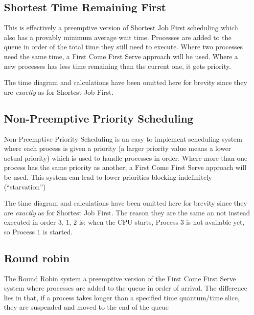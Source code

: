 \subsection{Shortest Time Remaining First}\label{sub:shortest_time_remaining_first}

This is effectively a preemptive version of Shortest Job First scheduling which also has a provably minimum average wait time.
Processes are added to the queue in order of the total time they still need to execute.
Where two processes need the same time, a First Come First Serve approach will be used.
Where a new processes has less time remaining than the current one, it gets priority.

\begin{note}
	The time diagram and calculations have been omitted here for brevity since they are \emph{exactly} as for Shortest Job First.
\end{note}

\subsection{Non-Preemptive Priority Scheduling}\label{sub:non_preemptive_priority_scheduling}

Non-Preemptive Priority Scheduling is an easy to implement scheduling system where each process is given a priority (a larger priority value means a lower actual priority) which is used to handle processes in order.
Where more than one process has the same priority as another, a First Come First Serve approach will be used.
This system can lead to lower priorities blocking indefinitely (``starvation'')

\begin{note}
	The time diagram and calculations have been omitted here for brevity since they are \emph{exactly} as for Shortest Job First.
	The reason they are the same an not instead executed in order \(3\), \(1\), \(2\) is: when the CPU starts, Process \(3\) is not available yet, so Process \(1\) is started.
\end{note}

\subsection{Round robin}\label{sub:round_robin}

The Round Robin system a preemptive version of the First Come First Serve system where processes are added to the queue in order of arrival.
The difference lies in that, if a process takes longer than a specified time quantum/time slice, they are suspended and moved to the end of the queue

